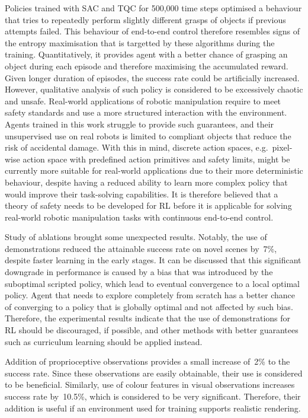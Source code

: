 Policies trained with SAC and TQC for 500,000 time steps optimised a behaviour that tries to repeatedly perform slightly different grasps of objects if previous attempts failed. This behaviour of end-to-end control therefore resembles signs of the entropy maximisation that is targetted by these algorithms during the training. Quantitatively, it provides agent with a better chance of grasping an object during each episode and therefore maximising the accumulated reward. Given longer duration of episodes, the success rate could be artificially increased. However, qualitative analysis of such policy is considered to be excessively chaotic and unsafe. Real-world applications of robotic manipulation require to meet safety standards and use a more structured interaction with the environment. Agents trained in this work struggle to provide such guarantees, and their unsupervised use on real robots is limited to compliant objects that reduce the risk of accidental damage. With this in mind, discrete action spaces, e.g.~pixel-wise action space with predefined action primitives and safety limits, might be currently more suitable for real-world applications due to their more deterministic behaviour, despite having a reduced ability to learn more complex policy that would improve their task-solving capabilities. It is therefore believed that a theory of safety needs to be developed for RL before it is applicable for solving real-world robotic manipulation tasks with continuous end-to-end control.

Study of ablations brought some unexpected results. Notably, the use of demonstrations reduced the attainable success rate on novel scenes by~7\%, despite faster learning in the early stages. It can be discussed that this significant downgrade in performance is caused by a bias that was introduced by the suboptimal scripted policy, which lead to eventual convergence to a local optimal policy. Agent that needs to explore completely from scratch has a better chance of converging to a policy that is globally optimal and not affected by such bias. Therefore, the experimental results indicate that the use of demonstrations for RL should be discouraged, if possible, and other methods with better guarantees such as curriculum learning should be applied instead.

Addition of proprioceptive observations provides a small increase of~2\% to the success rate. Since these observations are easily obtainable, their use is considered to be beneficial. Similarly, use of colour features in visual observations increases success rate by~10.5\%, which is considered to be very significant. Therefore, their addition is useful if an environment used for training supports realistic rendering.

